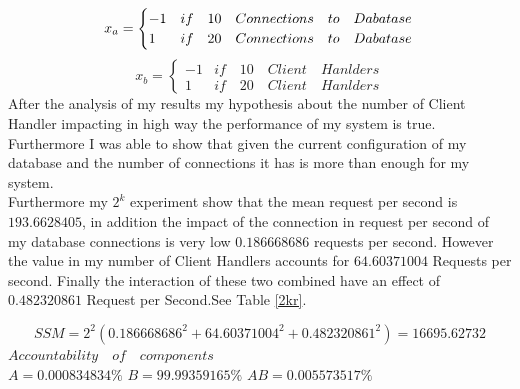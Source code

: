  $$x_{a}=\begin{cases} -1& if\quad 10 \quad Connections\quad  to\quad  Dabatase\\1 & if\quad 20 \quad Connections\quad  to\quad  Dabatase\end{cases}\\
 $$
 $$x_{b}=\begin{cases} -1& if\quad 10 \quad Client\quad Hanlders\\1 & if\quad 20 \quad Client\quad Hanlders\end{cases}$$
 After the analysis of my results my hypothesis about the number of Client Handler impacting in high way the performance of my system is true. Furthermore I was able to show that given the current configuration of my database and the number of connections it has is more than enough for my system.\\
 
Furthermore my $2^k$ experiment show that the mean request per second is $193.6628405$, in addition the impact of the connection in request per second of my database connections is very low $ 0.186668686$ requests per second. However the value in my number of Client Handlers accounts for $ 64.60371004$ Requests per second. Finally the interaction of these two combined have an effect of $ 0.482320861$ Request per Second.See Table \ref{2kr}.


\begin{table}[h]\centering
         \caption{Wieghts on the response variables}
         \label{2kr}
         
 \end{table}  
 $$SSM=2^2(0.186668686^2+64.60371004^2+0.482320861^2)=16695.62732$$
 $Accountability \quad of \quad components$\\
 $A=0.000834834\%$	$B=99.99359165\%$	$AB=0.005573517\%$\\
 

